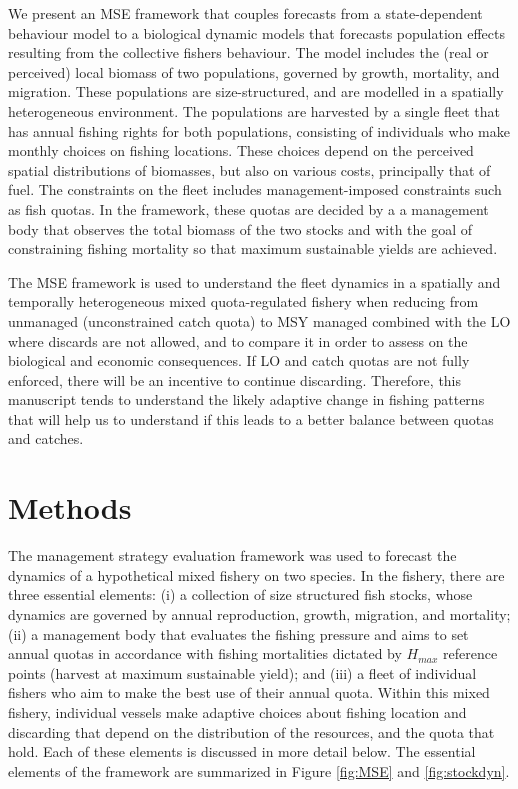 \documentclass[12pt,oneline,a4paper,numbib]{ouparticle}
\numberwithin{equation}{subsection} %
\begin{document}
We present an MSE framework that couples forecasts from a state-dependent behaviour model to a biological dynamic models that forecasts population effects resulting from the collective fishers behaviour. The model includes the (real or perceived) local biomass of two populations, governed by growth, mortality, and migration. These populations are size-structured, and are modelled in a spatially heterogeneous environment. The populations are harvested by a single fleet that has annual fishing rights for both populations, consisting of individuals who make monthly choices on fishing locations. These choices depend on the perceived spatial distributions of biomasses, but also on various costs, principally that of fuel. The constraints on the fleet  includes management-imposed constraints such as fish quotas. In the framework, these quotas are decided by a a management body that observes the total biomass of the two stocks and with the goal of constraining fishing mortality so that maximum sustainable yields are achieved.   

The MSE framework is used to understand the fleet dynamics in a spatially and temporally heterogeneous mixed quota-regulated fishery when reducing from unmanaged (unconstrained catch quota) to MSY managed combined with the LO where discards are not allowed, and to compare it in order to assess on the biological and economic consequences. If LO and catch quotas are not fully enforced, there will be an incentive to continue discarding. Therefore, this manuscript tends to understand the likely adaptive change in fishing patterns that will help us to understand if this leads to a better balance between quotas and catches.

\section{Methods}

The management strategy evaluation framework was used to forecast the dynamics of a hypothetical mixed fishery on two species. In the fishery, there are three essential elements: (i) a collection of size structured fish stocks, whose dynamics are governed by annual reproduction, growth, migration, and mortality; (ii) a management body that evaluates the fishing pressure and aims to set annual quotas in accordance with fishing mortalities dictated by $H_{max}$ reference points (harvest at maximum sustainable yield); and (iii) a fleet of individual fishers who aim to make the best use of their annual quota. Within this mixed fishery, individual vessels make adaptive choices about fishing location and discarding that depend on the distribution of the resources, and the quota that hold. Each of these elements is discussed in more detail below. The essential elements of the framework are summarized in Figure \ref{fig:MSE} and \ref{fig:stockdyn}.
\end{document}

